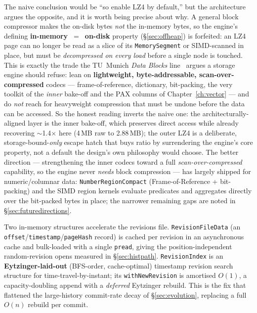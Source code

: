 \documentclass[11pt,a4paper,oneside]{report}
\theoremstyle{sirixthm}
\newcommand{\code}[1]{\texttt{#1}}
\begin{document}
The naive conclusion would be ``so enable LZ4 by default,'' but the architecture argues the opposite, and
it is worth being precise about why. A general block compressor makes the on-disk bytes \emph{not} the
in-memory bytes, so the engine's defining \textbf{in-memory~$=$~on-disk} property (\S\ref{sec:offheap}) is
forfeited: an LZ4 page can no longer be read as a slice of its \code{MemorySegment} or SIMD-scanned in
place, but must be \emph{decompressed on every load} before a single node is touched. This is exactly the
trade the TU~Munich \emph{Data Blocks} line~\cite{datablocks} argues a storage engine should refuse: lean
on \textbf{lightweight, byte-addressable, scan-over-compressed} codecs --- frame-of-reference, dictionary,
bit-packing, the very toolkit of the \emph{inner} bake-off and the PAX columns of Chapter~\ref{ch:vector}
--- and do \emph{not} reach for heavyweight compression that must be undone before the data can be
accessed. So the honest reading inverts the naive one: the architecturally-aligned layer is the inner
bake-off, which preserves direct access while already recovering $\sim$1.4$\times$ here (4\,MB raw to
2.88\,MB); the outer LZ4 is a deliberate, storage-bound-\emph{only} escape hatch that buys ratio by
surrendering the engine's core property, not a default the design's own philosophy would choose. The
better direction --- strengthening the inner codecs toward a full \emph{scan-over-compressed} capability,
so the engine never \emph{needs} block compression --- has largely shipped for numeric/columnar data:
\code{NumberRegionCompact} (Frame-of-Reference + bit-packing) and the SIMD region kernels evaluate
predicates and aggregates directly over the bit-packed bytes in place; the narrower remaining gaps are
noted in \S\ref{sec:futuredirections}.

Two in-memory structures accelerate the revisions file. \code{RevisionFileData} (an
\code{offset}/\allowbreak\code{timestamp}/\allowbreak\code{pageHash} record) is cached per revision in an asynchronous
cache and bulk-loaded with a single \code{pread}, giving the position-independent random-revision
opens measured in \S\ref{sec:histpath}. \code{RevisionIndex} is an \textbf{Eytzinger-laid-out}
(BFS-order, cache-optimal) timestamp\,\textrightarrow\,revision search structure for
time-travel-by-instant; its \code{withNewRevision} is amortised $O(1)$, a capacity-doubling
append with a \emph{deferred} Eytzinger rebuild. This is the fix that flattened the
large-history commit-rate decay of \S\ref{sec:evolution}, replacing a full $O(n)$ rebuild per
commit.
\end{document}
